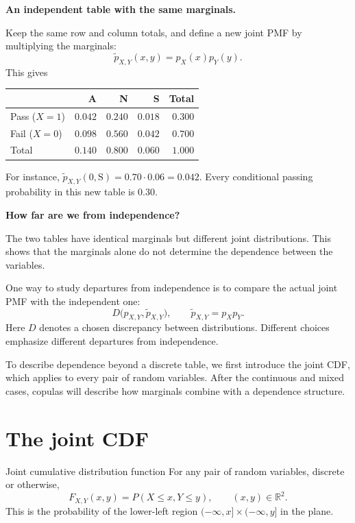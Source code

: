 \documentclass[a4paper,12pt,oneside]{report}
\begin{document}
\textbf{An independent table with the same marginals.}

Keep the same row and column totals, and define a new joint PMF
by multiplying the marginals:
\[
  \widetilde p_{X,Y}(x,y)=p_X(x)p_Y(y).
\]
This gives
\begin{center}
\begin{tabular}{lrrrr}
\toprule
 & A & N & S & Total\\
\midrule
Pass ($X=1$) & $0.042$ & $0.240$ & $0.018$ & $0.300$\\
Fail ($X=0$) & $0.098$ & $0.560$ & $0.042$ & $0.700$\\
\midrule
Total & $0.140$ & $0.800$ & $0.060$ & $1.000$\\
\bottomrule
\end{tabular}
\end{center}
For instance, $\widetilde p_{X,Y}(0,\mathrm S)=0.70\cdot0.06
=0.042$. Every conditional passing probability in this new
table is $0.30$.

\textbf{How far are we from independence?}

The two tables have identical marginals but different joint
distributions. This shows that the marginals alone do not
determine the dependence between the variables.

One way to study departures from independence is to compare the
actual joint PMF with the independent one:
\[
  D\bigl(p_{X,Y},\widetilde p_{X,Y}\bigr),
  \qquad \widetilde p_{X,Y}=p_Xp_Y.
\]
Here $D$ denotes a chosen discrepancy between distributions.
Different choices emphasize different departures from independence.

To describe dependence beyond a discrete table, we first introduce
the joint CDF, which applies to every pair of random variables.
After the continuous and mixed cases, copulas will describe how
marginals combine with a dependence structure.

\clearpage
\section{The joint CDF}
\label{sec:joint-cdf}

\begin{frameddefn}{Joint cumulative distribution function}
For any pair of random variables, discrete or otherwise,
\[
  F_{X,Y}(x,y)=P(X\leq x,Y\leq y),
  \qquad (x,y)\in\mathbb R^2.
\]
This is the probability of the lower-left region
$(-\infty,x]\times(-\infty,y]$ in the plane.
\end{frameddefn}
\end{document}
